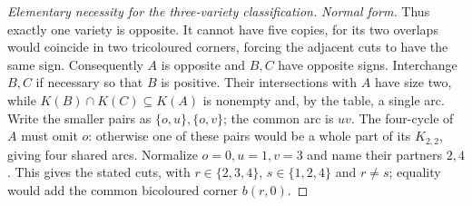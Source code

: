\begin{proof}[Elementary necessity for the three-variety classification]
\emph{Normal form.} Thus exactly one variety is opposite. It cannot have five copies, for its
two overlaps would coincide in two tricoloured corners, forcing the adjacent
cuts to have the same sign. Consequently $A$ is opposite and $B,C$ have
opposite signs. Interchange $B,C$ if necessary so that $B$ is positive.
Their intersections with $A$ have size two, while
$K(B)\cap K(C)\subseteq K(A)$ is nonempty and, by the table, a single arc.
Write the smaller pairs as $\{o,u\},\{o,v\}$; the common arc is $uv$.
The four-cycle of $A$ must omit $o$: otherwise one of these pairs would
be a whole part of its $K_{2,2}$, giving four shared arcs. Normalize
$o=0,u=1,v=3$ and name their partners $2,4$. This gives the stated cuts,
with $r\in\{2,3,4\}$, $s\in\{1,2,4\}$ and $r\ne s$; equality would
add the common bicoloured corner $b(r,0)$.

\end{proof}
